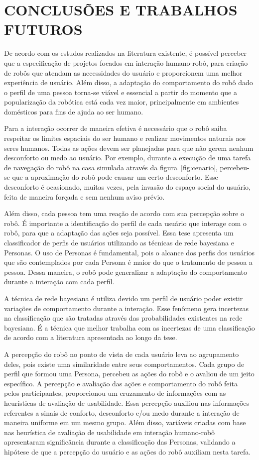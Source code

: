 \chapter{CONCLUSÕES E TRABALHOS FUTUROS}
\label{cap:conclusoes}
De acordo com os estudos realizados na literatura existente, é possível perceber que a especificação de projetos focados em interação humano-robô, para criação de robôs que atendam as necessidades do usuário e proporcionem uma melhor experiência de usuário. Além disso, a adaptação do comportamento do robô dado o perfil de uma pessoa torna-se viável e essencial a partir do momento que a popularização da robótica está cada vez maior, principalmente em ambientes domésticos para fins de ajuda ao ser humano.

Para a interação ocorrer de maneira efetiva é necessário que o robô saiba respeitar os limites espaciais do ser humano e realizar movimentos naturais aos seres humanos. Todas as ações devem ser planejadas para que não gerem nenhum desconforto ou medo ao usuário. Por exemplo, durante a execução de uma tarefa de navegação do robô na casa simulada através da figura~\ref{fig:cenario}, percebeu-se que a aproximação do robô pode causar um certo desconforto. Esse desconforto é ocasionado, muitas vezes, pela invasão do espaço social do usuário, feita de maneira forçada e sem nenhum aviso prévio.

Além disso, cada pessoa tem uma reação de acordo com sua percepção sobre o robô. É importante a identificação do perfil de cada usuário que interage com o robô, para que a adaptação das ações seja possível. Essa tese apresenta um classificador de perfis de usuários utilizando as técnicas de rede bayesiana e Personas. O uso de Personas é fundamental, pois o alcance dos perfis dos usuários que são contemplados por cada Persona é maior do que o tratamento de pessoa a pessoa. Dessa maneira, o robô pode generalizar a adaptação do comportamento durante a interação com cada perfil. 

A técnica de rede bayesiana é utiliza devido um perfil de usuário poder existir variações de comportamento durante a interação. Esse fenômeno gera incertezas na classificação que são tratadas através das probabilidades existentes na rede bayesiana. É a técnica que melhor trabalha com as incertezas de uma classificação de acordo com a literatura apresentada ao longo da tese.

A percepção do robô no ponto de vista de cada usuário leva ao agrupamento deles, pois existe uma similaridade entre seus comportamentos. Cada grupo de perfil que formou uma Persona, percebeu as ações do robô e o avaliou de um jeito específico. A percepção e avaliação das ações e comportamento do robô feita pelos participantes, proporcionou um cruzamento de informações com as heurísticas de avaliação de usabilidade. Essa percepção auxiliou nas informações referentes a sinais de conforto, desconforto e/ou medo durante a interação de maneira uniforme em um mesmo grupo. Além disso, variáveis criadas com base nas heurística de avaliação de usabilidade em interação humano-robô apresentaram significância durante a classificação das Personas, validando a hipótese de que a percepção do usuário e as ações do robô auxiliam nesta tarefa.

